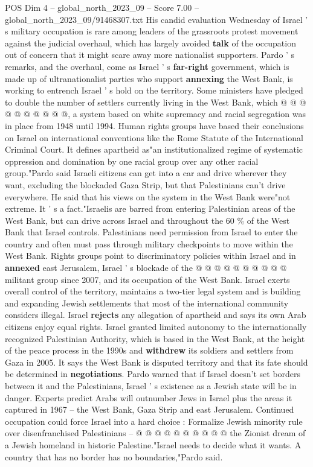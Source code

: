 \begin{textsample}{POS Dim 4 – global\_north\_2023\_09 – Score 7.00 – global\_north\_2023\_09/91468307.txt}
His candid evaluation Wednesday of Israel ' s military occupation is rare among leaders of the grassroots protest movement against the judicial overhaul, which has largely avoided \textbf{talk} of the occupation out of concern that it might scare away more nationalist supporters.
Pardo ' s remarks, and the overhaul, come as Israel ' s \textbf{far-right} government, which is made up of ultranationalist parties who support \textbf{annexing} the West Bank, is working to entrench Israel ' s hold on the territory.
Some ministers have pledged to double the number of settlers currently living in the West Bank, which @ @ @ @ @ @ @ @ @ @, a system based on white supremacy and racial segregation was in place from 1948 until 1994.
Human rights groups have based their conclusions on Israel on international conventions like the Rome Statute of the International Criminal Court.
It defines apartheid as"an institutionalized regime of systematic oppression and domination by one racial group over any other racial group."Pardo said Israeli citizens can get into a car and drive wherever they want, excluding the blockaded Gaza Strip, but that Palestinians can't drive everywhere.
He said that his views on the system in the West Bank were"not extreme.
It ' s a fact."Israelis are barred from entering Palestinian areas of the West Bank, but can drive across Israel and throughout the 60 \% of the West Bank that Israel controls.
Palestinians need permission from Israel to enter the country and often must pass through military checkpoints to move within the West Bank.
Rights groups point to discriminatory policies within Israel and in \textbf{annexed} east Jerusalem, Israel ' s blockade of the @ @ @ @ @ @ @ @ @ @ militant group since 2007, and its occupation of the West Bank.
Israel exerts overall control of the territory, maintains a two-tier legal system and is building and expanding Jewish settlements that most of the international community considers illegal.
Israel \textbf{rejects} any allegation of apartheid and says its own Arab citizens enjoy equal rights.
Israel granted limited autonomy to the internationally recognized Palestinian Authority, which is based in the West Bank, at the height of the peace process in the 1990s and \textbf{withdrew} its soldiers and settlers from Gaza in 2005.
It says the West Bank is disputed territory and that its fate should be determined in \textbf{negotiations}.
Pardo warned that if Israel doesn't set borders between it and the Palestinians, Israel ' s existence as a Jewish state will be in danger.
Experts predict Arabs will outnumber Jews in Israel plus the areas it captured in 1967 -- the West Bank, Gaza Strip and east Jerusalem.
Continued occupation could force Israel into a hard choice : Formalize Jewish minority rule over disenfranchised Palestinians -- @ @ @ @ @ @ @ @ @ @ the Zionist dream of a Jewish homeland in historic Palestine."Israel needs to decide what it wants.
A country that has no border has no boundaries,"Pardo said.

\end{textsample}
